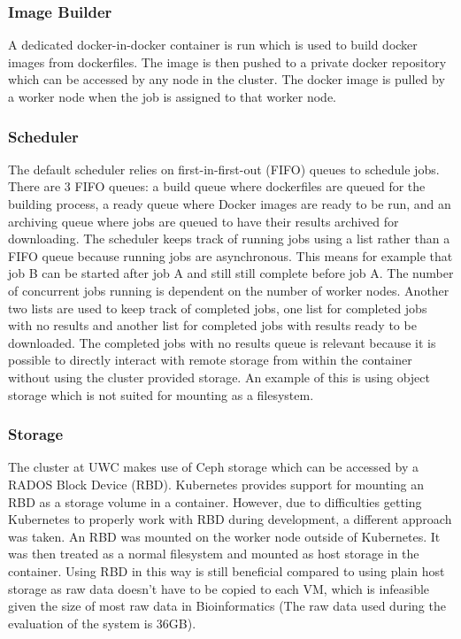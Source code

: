 \documentclass{sig-alternate-05-2015}
\begin{document}
\subsubsection{Image Builder}
A dedicated docker-in-docker container is run which is used to build docker images from dockerfiles. The image is then pushed to a private docker repository which can be accessed by any node in the cluster. The docker image is pulled by a worker node when the job is assigned to that worker node.

\subsubsection{Scheduler}
The default scheduler relies on first-in-first-out (FIFO) queues to schedule jobs. There are 3 FIFO queues: a build queue where dockerfiles are queued for the building process, a ready queue where Docker images are ready to be run, and an archiving queue where jobs are queued to have their results archived for downloading. The scheduler keeps track of running jobs using a list rather than a FIFO queue because running jobs are asynchronous. This means for example that job B can be started after job A and still still complete before job A. The number of concurrent jobs running is dependent on the number of worker nodes. Another two lists are used to keep track of completed jobs, one list for completed jobs with no results and another list for completed jobs with results ready to be downloaded. The completed jobs with no results queue is relevant because it is possible to directly interact with remote storage from within the container without using the cluster provided storage. An example of this is using object storage which is not suited for mounting as a filesystem.

\subsubsection{Storage}
The cluster at UWC makes use of Ceph storage which can be accessed by a RADOS Block Device (RBD). Kubernetes provides support for mounting an RBD as a storage volume in a container. However, due to difficulties getting Kubernetes to properly work with RBD during development, a different approach was taken. An RBD was mounted on the worker node outside of Kubernetes. It was then treated as a normal filesystem and mounted as host storage in the container. Using RBD in this way is still beneficial compared to using plain host storage as raw data doesn't have to be copied to each VM, which is infeasible given the size of most raw data in Bioinformatics (The raw data used during the evaluation of the system is 36GB).
\end{document}
